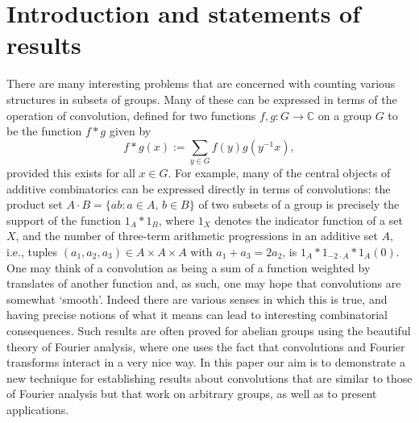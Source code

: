 \documentclass[12pt,a4paper,reqno]{amsart}
\numberwithin{equation}{section}
\theoremstyle{plain}
\theoremstyle{definition}
\def\C{\mathbb{C}}
\begin{document}
\section{Introduction and statements of results}
There are many interesting problems that are concerned with counting various structures in subsets of groups. Many of these can be expressed in terms of the operation of convolution, defined for two functions $f, g : G \to \C$ on a group $G$ to be the function $f*g$ given by
\[ f*g(x) := \sum_{y \in G} f(y)g(y^{-1}x), \]
provided this exists for all $x \in G$. For example, many of the central objects of additive combinatorics can be expressed directly in terms of convolutions: the product set $A \cdot B = \{ ab : \text{$a \in A$, $b \in B$} \}$ of two subsets of a group is precisely the support of the function $1_A*1_B$, where $1_X$ denotes the indicator function of a set $X$, and the number of three-term arithmetic progressions in an additive set $A$, i.e., tuples $(a_1,a_2,a_3) \in A\times A\times A$ with $a_1+a_3=2a_2$, is $1_A*1_{-2\cdot A}*1_A(0)$. One may think of a convolution as being a sum of a function weighted by translates of another function and, as such, one may hope that convolutions are somewhat `smooth'. Indeed there are various senses in which this is true, and having precise notions of what it means can lead to interesting combinatorial consequences. Such results are often proved for abelian groups using the beautiful theory of Fourier analysis, where one uses the fact that convolutions and Fourier transforms interact in a very nice way. In this paper our aim is to demonstrate a new technique for establishing results about convolutions that are similar to those of Fourier analysis but that work on arbitrary groups, as well as to present applications.
\end{document}
